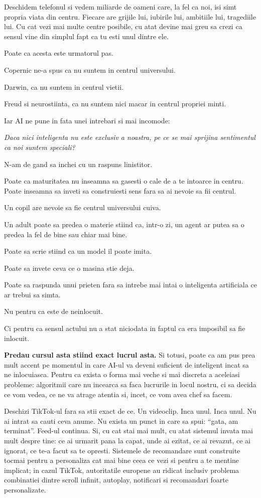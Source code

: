 Deschidem telefonul si vedem miliarde de oameni care, la fel ca noi,
isi simt propria viata din centru. Fiecare are grijile lui, iubirile
lui, ambitiile lui, tragediile lui. Cu cat vezi mai multe centre
posibile, cu atat devine mai greu sa crezi ca sensul vine din simplul
fapt ca tu esti unul dintre ele.

Poate ca acesta este urmatorul pas.

Copernic ne-a spus ca nu suntem in centrul universului.

Darwin, ca nu suntem in centrul vietii.

Freud si neurostiinta, ca nu suntem nici macar in centrul propriei
minti.

Iar AI ne pune in fata unei intrebari si mai incomode:

\textit{Daca nici inteligenta nu este exclusiv a noastra, pe ce se mai
sprijina sentimentul ca noi suntem speciali?}

N-am de gand sa inchei cu un raspuns linistitor.

Poate ca maturitatea nu inseamna sa gasesti o cale de a te intoarce in
centru. Poate inseamna sa inveti sa construiesti sens fara sa ai nevoie
sa fii centrul.

Un copil are nevoie sa fie centrul universului cuiva.

Un adult poate sa predea o materie stiind ca, intr-o zi, un agent ar
putea sa o predea la fel de bine sau chiar mai bine.

Poate sa scrie stiind ca un model il poate imita.

Poate sa invete ceva ce o masina stie deja.

Poate sa raspunda unui prieten fara sa intrebe mai intai o inteligenta
artificiala ce ar trebui sa simta.

Nu pentru ca este de neinlocuit.

Ci pentru ca sensul actului nu a stat niciodata in faptul ca era
imposibil sa fie inlocuit.

\textbf{Predau cursul asta stiind exact lucrul asta.} Si totusi, poate
ca am pus prea mult accent pe momentul in care AI-ul va deveni suficient
de inteligent incat sa ne inlocuiasca. Pentru ca exista o forma mai
veche si mai discreta a aceleiasi probleme: algoritmii care nu incearca
sa faca lucrurile in locul nostru, ci sa decida ce vom vedea, ce ne va
atrage atentia si, incet, ce vom avea chef sa facem.

Deschizi TikTok-ul fara sa stii exact de ce. Un videoclip. Inca unul.
Inca unul. Nu ai intrat sa cauti ceva anume. Nu exista un punct in care
sa spui: ``gata, am terminat''. Feed-ul continua. Si, cu cat stai mai
mult, cu atat sistemul invata mai mult despre tine: ce ai urmarit pana
la capat, unde ai ezitat, ce ai revazut, ce ai ignorat, ce te-a facut sa
te opresti. Sistemele de recomandare sunt construite tocmai pentru a
personaliza cat mai bine ceea ce vezi si pentru a te mentine implicat;
in cazul TikTok, autoritatile europene au ridicat inclusiv problema
combinatiei dintre scroll infinit, autoplay, notificari si recomandari
foarte personalizate.

